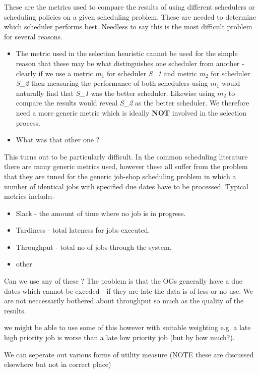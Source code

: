 These are the metrics used to compare the results of using different schedulers or scheduling policies on a given scheduling problem. These are needed to determine which scheduler performs best. Needless to say this is the most difficult problem for several reasons.
\begin{itemize}
\item The metric used in the selection heuristic cannot be used for the simple reason that these may be what distinguishes one scheduler from another - clearly if we use a metric $m_1$ for scheduler \emph{S\_1} and metric $m_2$ for scheduler \emph{S\_2} then measuring the performance of both schedulers using $m_1$ would naturally find that \emph{S\_1} was the better scheduler. Likewise using $m_2$ to compare the results would reveal \emph{S\_2} as the better scheduler. We therefore need a more generic metric which is ideally {\bf NOT} involved in the selection process.
\item What was that other one ?
\end{itemize}

This turns out to be particularly difficult. In the common scheduling literature there are many generic metrics used, however these all suffer from the problem that they are tuned for the generic job-shop scheduling problem in which a number of identical jobs with specified due dates have to be processed. Typical metrics include:-

\begin{itemize}
\item Slack - the amount of time where no job is in progress.
\item Tardiness - total lateness for jobs executed.
\item Throughput - total no of jobs through the system.
\item other
\end{itemize}

Can we use any of these ? The problem is that the OGs generally have a due dates which cannot be exceded - if they are late the data is of less or no use. We are not neccessarily bothered about throughput so much as the quality of the results. 

we might be able to use some of this however with suitable weighting e.g. a late high priority job is worse than a late low priority job (but by how much?). 

We can seperate out various forms of utility measure (NOTE these are discussed elsewhere but not in correct place)

